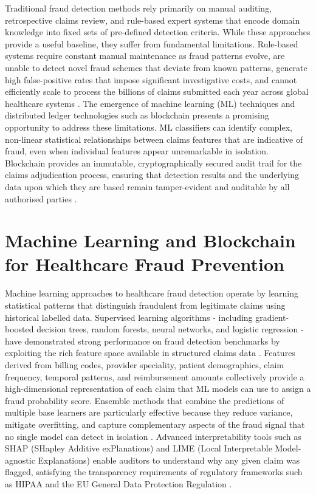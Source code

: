 Traditional fraud detection methods rely primarily on manual auditing, retrospective claims review, and rule-based expert systems that encode domain knowledge into fixed sets of pre-defined detection criteria. While these approaches provide a useful baseline, they suffer from fundamental limitations. Rule-based systems require constant manual maintenance as fraud patterns evolve, are unable to detect novel fraud schemes that deviate from known patterns, generate high false-positive rates that impose significant investigative costs, and cannot efficiently scale to process the billions of claims submitted each year across global healthcare systems \cite{tsai2019}. The emergence of machine learning (ML) techniques and distributed ledger technologies such as blockchain presents a promising opportunity to address these limitations. ML classifiers can identify complex, non-linear statistical relationships between claims features that are indicative of fraud, even when individual features appear unremarkable in isolation. Blockchain provides an immutable, cryptographically secured audit trail for the claims adjudication process, ensuring that detection results and the underlying data upon which they are based remain tamper-evident and auditable by all authorised parties \cite{hilal2022}.

\section{Machine Learning and Blockchain for Healthcare Fraud Prevention}

Machine learning approaches to healthcare fraud detection operate by learning statistical patterns that distinguish fraudulent from legitimate claims using historical labelled data. Supervised learning algorithms - including gradient-boosted decision trees, random forests, neural networks, and logistic regression - have demonstrated strong performance on fraud detection benchmarks by exploiting the rich feature space available in structured claims data \cite{wang2021deep}. Features derived from billing codes, provider speciality, patient demographics, claim frequency, temporal patterns, and reimbursement amounts collectively provide a high-dimensional representation of each claim that ML models can use to assign a fraud probability score. Ensemble methods that combine the predictions of multiple base learners are particularly effective because they reduce variance, mitigate overfitting, and capture complementary aspects of the fraud signal that no single model can detect in isolation \cite{tenepalli2022}. Advanced interpretability tools such as SHAP (SHapley Additive exPlanations) and LIME (Local Interpretable Model-agnostic Explanations) enable auditors to understand why any given claim was flagged, satisfying the transparency requirements of regulatory frameworks such as HIPAA and the EU General Data Protection Regulation \cite{li2021}.


